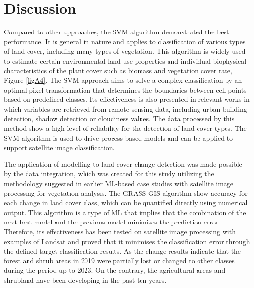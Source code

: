 \documentclass[remotesensing,article,submit,pdftex,moreauthors]{Definitions/mdpi}
\begin{document}
\section{Discussion}

{Compared to other approaches, the SVM algorithm demonstrated the best performance. It is general in nature and applies to classification of various types of land cover, including many types of vegetation. This algorithm is widely used to estimate certain environmental land-use properties and individual biophysical characteristics of the plant cover such as biomass and vegetation cover rate}, Figure \ref{figA4}. The SVM approach aims to solve a complex classification by an optimal pixel transformation that determines the boundaries between cell points based on predefined classes. Its effectiveness is also presented in relevant works in which variables are retrieved from remote sensing data, including urban building detection, shadow detection or cloudiness values. The data processed by this method show a high level of reliability for the detection of land cover types. The SVM algorithm is used to drive process-based models and can be applied to support satellite image classification.

The application of modelling to land cover change detection was made possible by the data integration, which was created for this study utilizing the methodology suggested in earlier ML-based case studies with satellite image processing for vegetation analysis. The GRASS GIS algorithm show accuracy for each change in land cover class, which can be quantified directly using numerical output. This algorithm is a type of ML that implies that the combination of the next best model and the previous model minimises the prediction error. Therefore, its effectiveness has been tested on satellite image processing with examples of Landsat and proved that it minimises the classification error through the defined target classification results. As the change results indicate that the forest and shrub areas in 2019 were partially lost or changed to other classes during the period up to 2023. On the contrary, the agricultural areas and shrubland have been developing in the past ten years.
\end{document}
